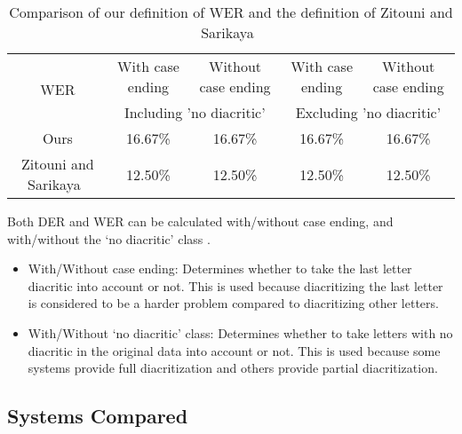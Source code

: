 \documentclass[conference]{IEEEtran}
\begin{document}
\begin{table*}
\centering
\caption{Comparison of our definition of WER and the definition of Zitouni and Sarikaya~\cite{zitouni2009arabic}}
\label{tab:newwer}
\begin{tabular}{|c|c|c|c|c|}
\hline
\multirow{2}{*}{WER} & With case ending & Without case ending & With case ending & Without case ending \\ \cline{2-5} 
 & \multicolumn{2}{c|}{Including 'no diacritic'} & \multicolumn{2}{c|}{Excluding 'no diacritic'} \\ \hline
Ours
& 16.67\% & 16.67\% & 16.67\% & 16.67\% \\ \hline
Zitouni and Sarikaya~\cite{zitouni2009arabic} & 12.50\% & 12.50\% & 12.50\% & 12.50\% \\ \hline
\end{tabular}
\end{table*}


Both DER and WER can be calculated with/without case ending, and with/without the `no diacritic' class \cite{zitouni2009arabic}.
\begin{itemize}
\item With/Without case ending: Determines whether to take the last letter diacritic into account or not. This is used because diacritizing the last letter is considered to be a harder problem compared to diacritizing other letters.

\item With/Without `no diacritic' class: Determines whether to take letters with no diacritic in the original data into account or not. This is used because some systems provide full diacritization and others provide partial diacritization.
\end{itemize}

\subsection{Systems Compared}
\label{sec:systems_issues}
\end{document}
